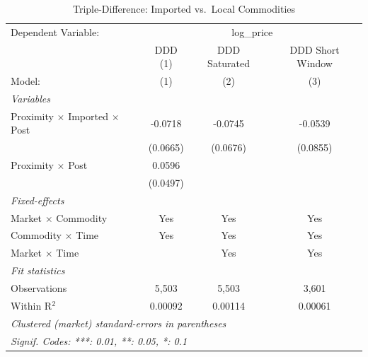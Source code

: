 
\begin{table}[htbp]
   \caption{\label{tab:triple} Triple-Difference: Imported vs.\ Local Commodities}
   \centering
   \begin{tabular}{lccc}
      \tabularnewline \midrule \midrule
      Dependent Variable: & \multicolumn{3}{c}{log\_price}\\
                                                  & DDD (1)  & DDD Saturated & DDD Short Window \\   
      Model:                                      & (1)      & (2)           & (3)\\  
      \midrule
      \emph{Variables}\\
      Proximity $\times$ Imported $\times$ Post   & -0.0718  & -0.0745       & -0.0539\\   
                                                  & (0.0665) & (0.0676)      & (0.0855)\\   
      Proximity $\times$ Post                     & 0.0596   &               &   \\   
                                                  & (0.0497) &               &   \\   
      \midrule
      \emph{Fixed-effects}\\
      Market $\times$ Commodity                   & Yes      & Yes           & Yes\\  
      Commodity $\times$ Time                     & Yes      & Yes           & Yes\\  
      Market $\times$ Time                        &          & Yes           & Yes\\  
      \midrule
      \emph{Fit statistics}\\
      Observations                                & 5,503    & 5,503         & 3,601\\  
      Within R$^2$                                & 0.00092  & 0.00114       & 0.00061\\  
      \midrule \midrule
      \multicolumn{4}{l}{\emph{Clustered (market) standard-errors in parentheses}}\\
      \multicolumn{4}{l}{\emph{Signif. Codes: ***: 0.01, **: 0.05, *: 0.1}}\\
   \end{tabular}
\end{table}


